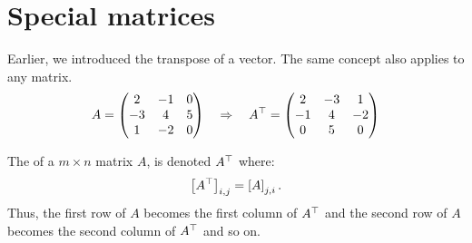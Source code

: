 \documentclass{ximera}
\begin{document}
\section{Special matrices}
Earlier, we introduced the transpose of a vector. The same concept
also applies to any matrix.
\[
A = \begin{pmatrix}
2 & -1 & 0\\
-3 & 4 & 5\\
1 & -2 & 0
\end{pmatrix}
\quad\Rightarrow\quad
A^{\top} = \begin{pmatrix}
2 & -3 & 1\\
-1 & 4 & -2\\
0& 5 & 0
\end{pmatrix}
\]
\begin{definition} The  of a $m\times n$ matrix $A$, is denoted $A^\top$ where:
  \[
    \left[ A^\top \right]_{i,j} = \left[ A \right]_{j,i}.
  \]
 Thus, the first row of $A$ becomes the first column of
  $A^{\top}$ and the second row of $A$ becomes the second column
 of $A^{\top}$ and so on.
\end{definition}
\end{document}
